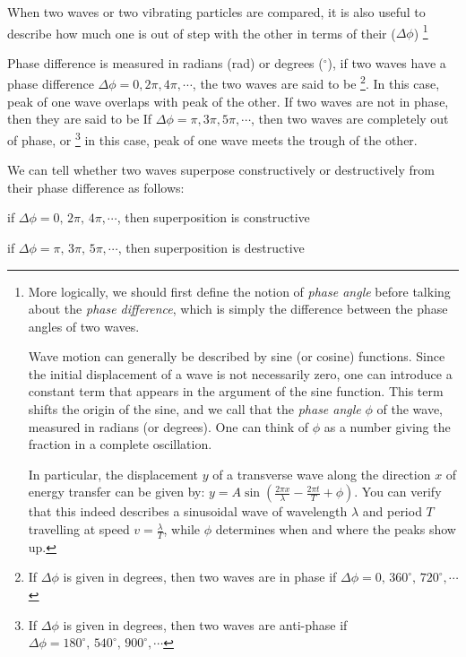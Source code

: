 When two waves or two vibrating particles are compared, it is also useful to describe how much one is out of step with the other in terms of their  ($\Delta \phi$)
\footnote{More logically, we should first define the notion of \emph{phase angle} before talking about the \emph{phase difference}, which is simply the difference between the phase angles of two waves.
	
	Wave motion can generally be described by sine (or cosine) functions. Since the initial displacement of a wave is not necessarily zero, one can introduce a constant term that appears in the argument of the sine function. This term shifts the origin of the sine, and we call that the \emph{phase angle} $\phi$ of the wave, measured in radians (or degrees). One can think of $\phi$ as a number giving the fraction in a complete oscillation.
	
	In particular, the displacement $y$ of a transverse wave along the direction $x$ of energy transfer can be given by: $y = A \sin\left( \frac{2\pi x}{\lambda} - \frac{2\pi t}{T} + \phi \right)$. You can verify that this indeed describes a sinusoidal wave of wavelength $\lambda$ and period $T$ travelling at speed $v = \frac{\lambda}{T}$, while $\phi$ determines when and where the peaks show up.}

Phase difference is measured in radians (rad) or degrees ($^\circ$),  if two waves have a phase difference $\Delta \phi = 0,2\pi,4\pi,\cdots$, the two waves are said to be \footnote{If $\Delta \phi$ is given in degrees, then two waves are in phase if $\Delta \phi = 0, \, 360^\circ, \, 720^\circ, \cdots$}. In this case, peak of one wave overlaps with peak of the other. If two waves are not in phase, then they are said to be 
If $\Delta \phi = \pi, 3\pi, 5\pi, \cdots$, then two waves are completely out of phase, or \footnote{If $\Delta \phi$ is given in degrees, then two waves are anti-phase if $\Delta \phi = 180^\circ, \, 540^\circ, \, 900^\circ, \cdots$} in this case, peak of one wave meets the trough of the other. 

We can tell whether two waves superpose constructively or destructively from their phase difference as follows:

{
	
	\centering
	\vspace*{6pt}
	\begin{tcolorbox}[colframe=red, colback=yellow!30, width=0.65\textwidth]
		\setlength{\baselineskip}{\baselineskip}%
		
		\centering
		
		if ${\Delta \phi = 0, \, 2\pi, \,4\pi, \cdots}$, then superposition is constructive
		
		if ${\Delta \phi = \pi, \, 3\pi, \, 5\pi, \cdots}$, then superposition is destructive
		
	\end{tcolorbox}\vspace*{-4pt}
	
}






